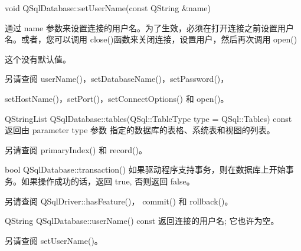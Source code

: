 void QSqlDatabase::setUserName(const QString \&name)

通过 name 参数来设置连接的用户名。为了生效，必须在打开连接之前设置用户名。或者，您可以调用 close()函数来关闭连接，设置用户，然后再次调用 open()

这个没有默认值。

另请查阅 userName()，setDatabaseName()，setPassword()，

setHostName()，setPort()，setConnectOptions() 和 open()。

QStringList QSqlDatabase::tables(QSql::TableType type = QSql::Tables) const
返回由 parameter type 参数 指定的数据库的表格、系统表和视图的列表。

另请查阅 primaryIndex() 和 record()。

bool QSqlDatabase::transaction()
如果驱动程序支持事务，则在数据库上开始事务。如果操作成功的话，返回 true, 否则返回 false。

另请查阅 QSqlDriver::hasFeature()， commit() 和 rollback()。

QString QSqlDatabase::userName() const
返回连接的用户名; 它也许为空。

另请查阅 setUserName()。

